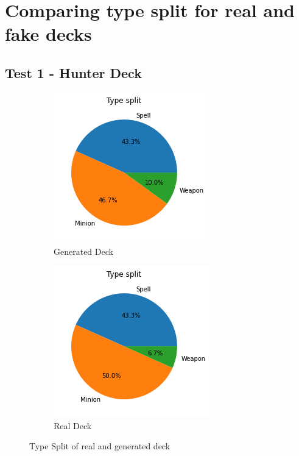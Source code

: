 \documentclass{report} %
\begin{document}
\section{Comparing type split for real and fake decks}
\subsection{Test 1 - Hunter Deck}
\begin{figure}[H]
\centering
\begin{subfigure}{.5\textwidth}
  \centering
  \includegraphics[width=.75\linewidth]{TestImages/HunterDeckSplitFake}
  \caption{Generated Deck}
\end{subfigure}%
\begin{subfigure}{.5\textwidth}
  \centering
  \includegraphics[width=.75\linewidth]{TestImages/HunterDeckSplitReal}
  \caption{Real Deck}
\end{subfigure}
\caption{Type Split of real and generated deck}
\end{figure}
\end{document}
